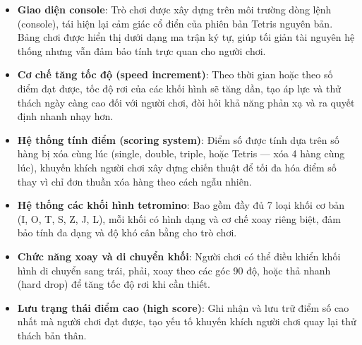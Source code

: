 \begin{itemize}
    \item \textbf{Giao diện console}: Trò chơi được xây dựng trên môi trường dòng lệnh (console), tái hiện lại cảm giác cổ điển của phiên bản Tetris nguyên bản. Bảng chơi được hiển thị dưới dạng ma trận ký tự, giúp tối giản tài nguyên hệ thống nhưng vẫn đảm bảo tính trực quan cho người chơi.
    
    \item \textbf{Cơ chế tăng tốc độ (speed increment)}: Theo thời gian hoặc theo số điểm đạt được, tốc độ rơi của các khối hình sẽ tăng dần, tạo áp lực và thử thách ngày càng cao đối với người chơi, đòi hỏi khả năng phản xạ và ra quyết định nhanh nhạy hơn.
    
    \item \textbf{Hệ thống tính điểm (scoring system)}: Điểm số được tính dựa trên số hàng bị xóa cùng lúc (single, double, triple, hoặc Tetris — xóa 4 hàng cùng lúc), khuyến khích người chơi xây dựng chiến thuật để tối đa hóa điểm số thay vì chỉ đơn thuần xóa hàng theo cách ngẫu nhiên.
    
    \item \textbf{Hệ thống các khối hình tetromino}: Bao gồm đầy đủ 7 loại khối cơ bản (I, O, T, S, Z, J, L), mỗi khối có hình dạng và cơ chế xoay riêng biệt, đảm bảo tính đa dạng và độ khó cân bằng cho trò chơi.
    
    \item \textbf{Chức năng xoay và di chuyển khối}: Người chơi có thể điều khiển khối hình di chuyển sang trái, phải, xoay theo các góc 90 độ, hoặc thả nhanh (hard drop) để tăng tốc độ rơi khi cần thiết.
    
    \item \textbf{Lưu trạng thái điểm cao (high score)}: Ghi nhận và lưu trữ điểm số cao nhất mà người chơi đạt được, tạo yếu tố khuyến khích người chơi quay lại thử thách bản thân.
\end{itemize}